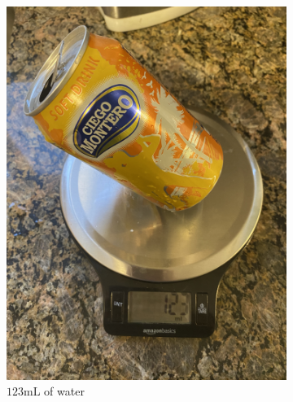 \documentclass[11pt]{article}
\begin{document}
\begin{figure}[H]
\begin{subfigure}{.3\textwidth}
            \includegraphics[width=.95\linewidth]{images/scale_123.JPG}
            \vspace{-8pt}
            \caption{$123 \mathrm{mL}$ of water}
            \label{fig:scale-123}
        \end{subfigure}
        \begin{subfigure}{.3\textwidth}
            \centering

\end{subfigure}
\end{figure}
\end{document}
